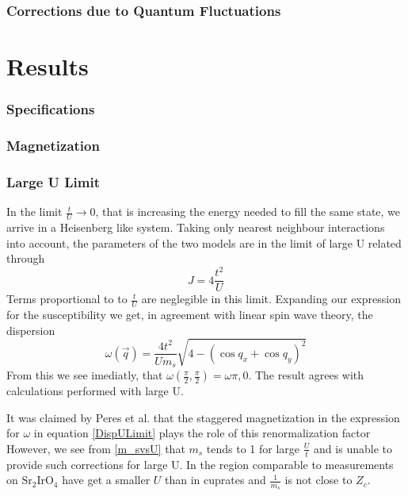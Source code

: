 \documentclass[a4paper,10pt]{report}
\begin{document}
 \subsection{Corrections due to Quantum Fluctuations}
 
 

 
 
\chapter{Results}

\subsection{Specifications} %

\subsection{Magnetization} %

\subsection{Large U Limit}

In the limit $\frac{t}{U}\rightarrow 0$, that is increasing the energy needed to fill the same state, we arrive in a Heisenberg like system. 
Taking only nearest neighbour interactions into account, the parameters of the two models are in the limit of large U related through
\begin{equation}
 J=4\frac{t^2}{U}
\end{equation}
Terms proportional to to $\frac tU$ are neglegible in this limit. 
Expanding our expression for the susceptibility we get, in agreement with linear spin wave theory,
the dispersion
\begin{equation}
 \omega(\vec q) = \frac{4t^2}{Um_s}\sqrt{4-(\cos q_x+\cos q_y)^2} \label{DispULimit}
\end{equation}
From this we see imediatly, that $\omega(\frac{\pi}2 , \frac{\pi}2) = \omega{\pi,0}$.
The result agrees with calculations performed with large U.


It was claimed by Peres et al. that the staggered magnetization in the expression for $\omega$ in equation \ref{DispULimit} plays the role of this renormalization factor \cite{PhysRevB.65.132404}
However, we see from \ref{m_svsU} that $m_s$ tends to 1 for large $\frac Ut$ and is unable to provide such corrections for large U.
In the region comparable to measurements on $\text{Sr}_2\text{IrO}_4$ have get a smaller $U$ than in cuprates and $\frac{1}{m_s}$ is not close to $Z_c$. 
\end{document}
